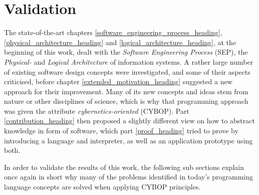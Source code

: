 %
%
%
%
%
%
%

\section{Validation}
\label{validation_heading}

The state-of-the-art chapters \ref{software_engineering_process_heading},
\ref{physical_architecture_heading} and \ref{logical_architecture_heading}, at
the beginning of this work, dealt with the \emph{Software Engineering Process}
(SEP), the \emph{Physical-} and \emph{Logical Architecture} of information
systems. A rather large number of existing software design concepts were
investigated, and some of their aspects criticised, before chapter
\ref{extended_motivation_heading} suggested a new approach for their
improvement. Many of its new concepts and ideas stem from nature or other
disciplines of science, which is why that programming approach was given the
attribute \emph{cybernetics-oriented} (CYBOP). Part \ref{contribution_heading}
then proposed a slightly different view on how to abstract knowledge in form of
software, which part \ref{proof_heading} tried to prove by introducing a
language and interpreter, as well as an application prototype using both.

In order to validate the results of this work, the following sub sections
explain once again in short why many of the problems identified in today's
programming language concepts are solved when applying CYBOP principles.




